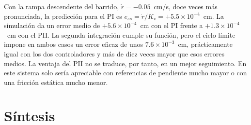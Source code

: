 Con la rampa descendente del barrido, $\dot r=-0.05$~cm/s, doce veces más pronunciada, la predicción para el PI es $e_{ss}=\dot r/K_v=+5.5\times10^{-4}$~cm. La simulación da un error medio de $+5.6\times10^{-4}$~cm con el PI frente a $+1.3\times10^{-4}$~cm con el PII. La segunda integración cumple su función, pero el ciclo límite impone en ambos casos un error eficaz de unos $7.6\times10^{-3}$~cm, prácticamente igual con los dos controladores y más de diez veces mayor que esos errores medios. La ventaja del PII no se traduce, por tanto, en un mejor seguimiento. En este sistema solo sería apreciable con referencias de pendiente mucho mayor o con una fricción estática mucho menor.

\section{Síntesis}\label{sec:sintesis_doble_integral}

